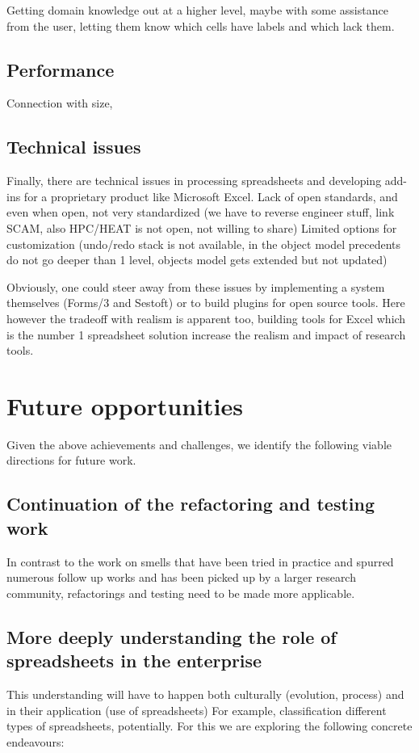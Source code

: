 \documentclass[conference]{IEEEtran}
\begin{document}
Getting domain knowledge out at a higher level, maybe with some assistance from the user, letting them know which cells have labels and which lack them.

\subsection{Performance}
Connection with size, 

\subsection{Technical issues}
Finally, there are technical issues in processing spreadsheets and developing add-ins for a proprietary product like Microsoft Excel. 
Lack of open standards, and even when open, not very standardized (we have to reverse engineer stuff, link SCAM, also HPC/HEAT is not open, not willing to share)
Limited options for customization (undo/redo stack is not available, in the object model precedents do not go deeper than 1 level, objects model gets extended but not updated)

Obviously, one could steer away from these issues by implementing a system themselves (Forms/3 and Sestoft) or to build plugins for open source tools. Here however the tradeoff with realism is apparent too, building tools for Excel which is the number 1 spreadsheet solution increase the realism and impact of research tools.

\section{Future opportunities}
Given the above achievements  and challenges, we identify the following viable directions for future work.

\subsection{Continuation of the refactoring and testing work}
In contrast to the work on smells that have been tried in practice and spurred numerous follow up works and has been picked up by a larger research community, refactorings and testing need to be made more applicable.

\subsection{More deeply understanding the role of spreadsheets in the enterprise}
This understanding will have to happen both culturally (evolution, process) and in their application (use of spreadsheets) For example, classification different types of spreadsheets, potentially. For this we are exploring the following concrete endeavours:
\end{document}
